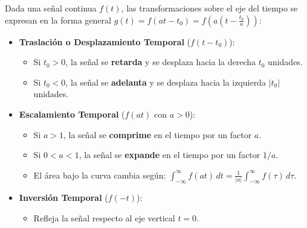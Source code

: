 \begin{tcolorbox}[cajaResumen, title={Resumen de Transformaciones Elementales de la Variable Independiente}]
Dada una señal continua $f(t)$, las transformaciones sobre el eje del tiempo se expresan en la forma general $g(t) = f(at - t_0) = f\left(a\left(t - \frac{t_0}{a}\right)\right)$:
\begin{itemize}[leftmargin=*]
    \item \textbf{Traslación o Desplazamiento Temporal} ($f(t - t_0)$):
    \begin{itemize}
        \item Si $t_0 > 0$, la señal se \textbf{retarda} y se desplaza hacia la derecha $t_0$ unidades.
        \item Si $t_0 < 0$, la señal se \textbf{adelanta} y se desplaza hacia la izquierda $|t_0|$ unidades.
    \end{itemize}
    \item \textbf{Escalamiento Temporal} ($f(at)$ con $a > 0$):
    \begin{itemize}
        \item Si $a > 1$, la señal se \textbf{comprime} en el tiempo por un factor $a$.
        \item Si $0 < a < 1$, la señal se \textbf{expande} en el tiempo por un factor $1/a$.
        \item El área bajo la curva cambia según: $\int_{-\infty}^{\infty} f(at) \, dt = \frac{1}{|a|} \int_{-\infty}^{\infty} f(\tau) \, d\tau$.
    \end{itemize}
    \item \textbf{Inversión Temporal} ($f(-t)$):
    \begin{itemize}
        \item Refleja la señal respecto al eje vertical $t = 0$.
    \end{itemize}
\end{itemize}
\end{tcolorbox}

\newpage

